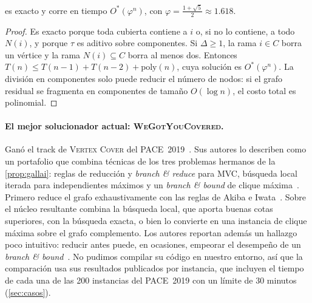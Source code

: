\begin{proposition}\label{prop:dc}
 es exacto y corre en tiempo $O^*(\varphi^{n})$, con $\varphi=\frac{1+\sqrt5}{2}\approx1.618$.
\end{proposition}
\begin{proof}
Es exacto porque toda cubierta contiene a $i$ o, si no lo contiene, a todo $N(i)$, y porque $\tau$ es aditivo sobre componentes. Si $\Delta\ge 1$, la rama $i\in C$ borra un vértice y la rama $N(i)\subseteq C$ borra al menos dos. Entonces $T(n)\le T(n-1)+T(n-2)+\mathrm{poly}(n)$, cuya solución es $O^*(\varphi^n)$. La división en componentes solo puede reducir el número de nodos: si el grafo residual se fragmenta en componentes de tamaño $O(\log n)$, el costo total es polinomial.
\end{proof}

\paragraph{El mejor solucionador actual: \textsc{WeGotYouCovered}.} Ganó el track de \textsc{Vertex Cover} del PACE~2019~\citep{dzulfikar2019,hespe2020}. Sus autores lo describen como un portafolio que combina técnicas de los tres problemas hermanos de la \cref{prop:gallai}: reglas de reducción y \emph{branch \& reduce} para MVC, búsqueda local iterada para independientes máximos y un \emph{branch \& bound} de clique máxima~\citep{hespe2020}. Primero reduce el grafo exhaustivamente con las reglas de Akiba e Iwata~\citep{akiba2016}. Sobre el núcleo resultante combina la búsqueda local, que aporta buenas cotas superiores, con la búsqueda exacta, o bien lo convierte en una instancia de clique máxima sobre el grafo complemento. Los autores reportan además un hallazgo poco intuitivo: reducir antes puede, en ocasiones, empeorar el desempeño de un \emph{branch \& bound}~\citep{hespe2020}. No pudimos compilar su código en nuestro entorno, así que la comparación usa sus resultados publicados por instancia, que incluyen el tiempo de cada una de las 200 instancias del PACE~2019 con un límite de 30 minutos (\cref{sec:casos}).

